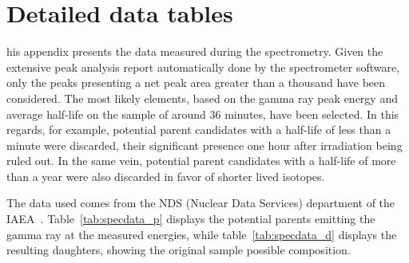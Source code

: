 \chapter{Detailed data tables}
\label{app:app02}

his appendix presents the data measured during the spectrometry. Given the extensive peak analysis report automatically done by the spectrometer software, only the peaks presenting a net peak area greater than a thousand have been considered. The most likely elements, based on the gamma ray peak energy and average half-life on the sample of around 36 minutes, have been selected. In this regards, for example, potential parent candidates with a half-life of less than a minute were discarded, their significant presence one hour after irradiation being ruled out. In the same vein, potential parent candidates with a half-life of more than a year were also discarded in favor of shorter lived isotopes.

The data used comes from the NDS (Nuclear Data Services) department of the IAEA~\cite{iaea_nds}. Table~\ref{tab:specdata_p} displays the potential parents emitting the gamma ray at the measured energies, while table~\ref{tab:specdata_d} displays the resulting daughters, showing the original sample possible composition.

